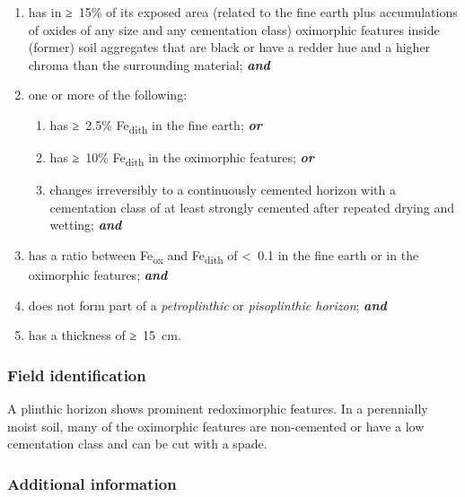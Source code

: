 \documentclass[
  letterpaper,
  DIV=11,
  numbers=noendperiod]{scrreprt}
\providecommand{\tightlist}{%
  \setlength{\itemsep}{0pt}\setlength{\parskip}{0pt}}\usepackage{longtable,booktabs,array}
\begin{document}
\begin{enumerate}
\def\labelenumi{\arabic{enumi}.}
\tightlist
\item
  has in ≥~15\% of its exposed area (related to the fine earth plus
  accumulations of oxides of any size and any cementation class)
  oximorphic features inside (former) soil aggregates that are black or
  have a redder hue and a higher chroma than the surrounding material;
  \textbf{\emph{and}}
\item
  one or more of the following:

  \begin{enumerate}
  \def\labelenumii{\alph{enumii}.}
  \tightlist
  \item
    has ≥~2.5\% Fe\textsubscript{dith} in the fine earth;
    \textbf{\emph{or}}
  \item
    has ≥~10\% Fe\textsubscript{dith} in the oximorphic features;
    \textbf{\emph{or}}
  \item
    changes irreversibly to a continuously cemented horizon with a
    cementation class of at least strongly cemented after repeated
    drying and wetting; \textbf{\emph{and}}
  \end{enumerate}
\item
  has a ratio between Fe\textsubscript{ox} and Fe\textsubscript{dith} of
  \textless~0.1 in the fine earth or in the oximorphic features;
  \textbf{\emph{and}}
\item
  does not form part of a \emph{petroplinthic} or \emph{pisoplinthic
  horizon}; \textbf{\emph{and}}
\item
  has a thickness of ≥~15~cm.
\end{enumerate}

\hypertarget{field-identification-22}{%
\subsubsection{Field identification}\label{field-identification-22}}

A plinthic horizon shows prominent redoximorphic features. In a
perennially moist soil, many of the oximorphic features are non-cemented
or have a low cementation class and can be cut with a spade.

\hypertarget{additional-information-16}{%
\subsubsection{Additional information}\label{additional-information-16}}
\end{document}
